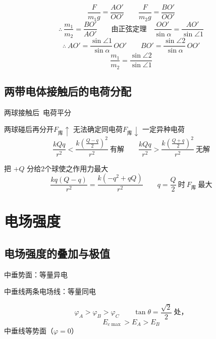 \[
\frac{F}{m_1g}=\frac{AO'}{OO'}\qquad \frac{F}{m_2g}=\frac{BO'}{OO'}
\]
\[
\therefore\ \frac{m_1}{m_2}=\frac{BO'}{AO'}\qquad \text{由正弦定理}\quad \frac{OO'}{\sin\alpha}=\frac{AO'}{\sin\angle1}
\]
\[
\therefore\ AO'=\frac{\sin\angle1}{\sin\alpha}\,OO'\qquad BO'=\frac{\sin\angle2}{\sin\alpha}\,OO'
\]
\[
\frac{m_1}{m_2}=\frac{\sin\angle2}{\sin\angle1}
\]

\subsection{两带电体接触后的电荷分配}
两球接触后\ 电荷平分

两球碰后再分开\quad $F_{\text{库}}\uparrow$ 无法确定同电荷\quad $F_{\text{库}}\downarrow$ 一定异种电荷
\[
\frac{kQq}{r^{2}}<\frac{k\left(\frac{Q-q}{2}\right)^{2}}{r^{2}}\ \text{有解}\qquad
\frac{kQq}{r^{2}}>\frac{k\left(\frac{Q+q}{2}\right)^{2}}{r^{2}}\ \text{无解}
\]

把 $+Q$ 分给2个球使之作用力最大
\[
\frac{kq(Q-q)}{r^{2}}=\frac{k(-q^{2}+qQ)}{r^{2}}\qquad q=\frac{Q}{2}\ \text{时}\ F_{\text{库}}\ \text{最大}
\]


\section{电场强度}
\subsection{电场强度的叠加与极值}
中垂势面：等量异电

中垂线\unclear{/}两条电场线：等量同电

\begin{keybox}
\quad{} %
\end{keybox}

\[
\varphi_A>\varphi_B>\varphi_C\qquad \tan\theta=\frac{\sqrt{2}}{2}\ \text{处，}
\]
\[
E_{c\max}>E_A>E_B
\]
中垂线等势面（$\varphi=0$）


